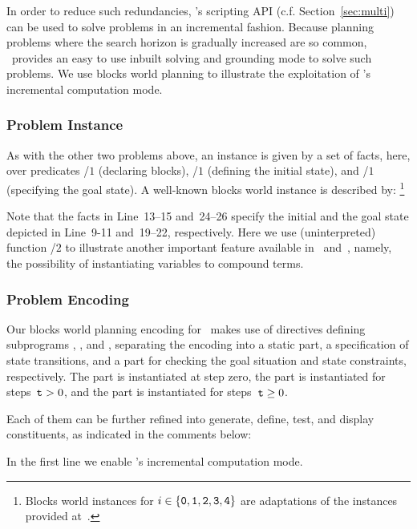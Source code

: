In order to reduce such redundancies,
\clingo's scripting API (c.f. Section~\ref{sec:multi}) can be used to solve problems in an incremental fashion.
Because planning problems where the search horizon is gradually increased are so common,
\clingo\ provides an easy to use inbuilt solving and grounding mode to solve such problems.
We use blocks world planning to illustrate the exploitation of
\clingo's incremental computation mode.

\subsubsection{Problem Instance}\label{subsec:block:instance}

As with the other two problems above,
an instance is given by a set of facts, here,
over predicates /$1$ (declaring blocks),
/$1$ (defining the initial state), and
/$1$ (specifying the goal state).
A well-known blocks world instance is described by:%
\footnote{%
  Blocks world instances  for $i\in\{\texttt{0},\texttt{1},\texttt{2},\texttt{3},\texttt{4}\}$
  are adaptations of the instances provided at~\cite{erdemBW}.}
%

%
Note that the facts in Line~13--15 and~24--26 specify the initial
and the goal state depicted in Line~9-11 and~19--22, respectively.
Here we use (uninterpreted) function /$2$ to illustrate another
important feature available in \gringo\ and~\clingo, namely,
the possibility of instantiating variables to compound terms.


\subsubsection{Problem Encoding}\label{subsec:block:encoding}

Our blocks world planning encoding for \clingo\ makes use of  directives
defining subprograms , , and ,
separating the encoding into 
a static part, 
a specification of state transitions, 
and a part for checking the goal situation and state constraints, respectively.
The  part is instantiated at step zero,
the  part is instantiated for steps~$\texttt{t}>0$,
and the  part is instantiated for steps~$\texttt{t}\geq0$.

Each of them can be further refined into generate, define, test, and display constituents, 
as indicated in the comments below:
%

%
In the first line we enable \clingo's incremental computation mode.

